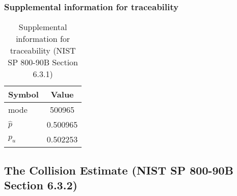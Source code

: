 \documentclass[a3paper,xelatex,english]{bxjsarticle}
\begin{document}
\subsubsection{Supplemental information for traceability}
\renewcommand{\arraystretch}{1.8}
\begin{table}[h]
\caption{Supplemental information for traceability (NIST SP 800-90B Section 6.3.1)}
\begin{center}
\begin{tabular}{|l|c|}
\hline 
\rowcolor{anotherlightblue} %
Symbol				& Value \\ \hline 
mode				&   500965\\ \hline 
$\hat{p}$ 			& 0.500965\\ \hline
$p_u$				& 0.502253\\ \hline
\end{tabular}
\end{center}
\end{table}
\renewcommand{\arraystretch}{1.4}
\clearpage
\subsection{The Collision Estimate (NIST SP 800-90B Section 6.3.2)}\label{sec:Binary632}
\end{document}
